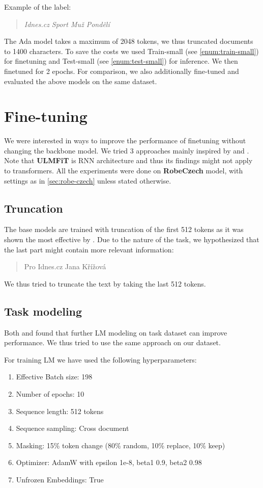 Example of the label:
\begin{quotation}
    \textit{Idnes.cz Sport Muž Pondělí}
\end{quotation}

The Ada model takes a maximum of 2048 tokens, we thus truncated documents to 1400 characters.
To save the costs we used Train-small (see \autoref{enum:train-small}) for finetuning and
Test-small (see \autoref{enum:test-small}) for inference.
We then finetuned for 2 epochs.
For comparison, we also additionally fine-tuned and evaluated the above models on the same dataset.

\section{Fine-tuning}
\label{sec:finetuning}
We were interested in ways to improve the performance of finetuning without changing the backbone model.
We tried 3 approaches mainly inspired by \cite{howardUniversalLanguageModel2018a} and \cite{sunHowFineTuneBERT2020}.
Note that \textbf{ULMFiT} is RNN architecture and thus its findings might not apply to transformers.
All the experiments were done on \textbf{RobeCzech} model, with settings as in \autoref{sec:robe-czech}
unless stated otherwise.

\subsection{Truncation}
\label{sec:truncation}
The base models are trained with truncation of the first 512 tokens as it was shown
the most effective by \cite{sunHowFineTuneBERT2020}. Due to the nature of the task,
we hypothesized that the last part might contain more relevant information:
\begin{quotation}
    Pro Idnes.cz Jana Křížová
\end{quotation}
We thus tried to truncate the text by taking the last
512 tokens.

\subsection{Task modeling}
\label{sec:task-modeling}
Both \cite{howardUniversalLanguageModel2018a} and \cite{sunHowFineTuneBERT2020}
found that further LM modeling on task dataset can improve performance.
We thus tried to use the same approach on our dataset.

For training LM we have used the following hyperparameters:
\begin{enumerate}
    \item Effective Batch size: 198
    \item Number of epochs: 10
    \item Sequence length: 512 tokens
    \item Sequence sampling: Cross document
    \item Masking: 15\% token change (80\% random, 10\% replace, 10\% keep)
    \item Optimizer: AdamW with epsilon 1e-8, beta1 0.9, beta2 0.98
    \item Unfrozen Embeddings: True
\end{enumerate}




